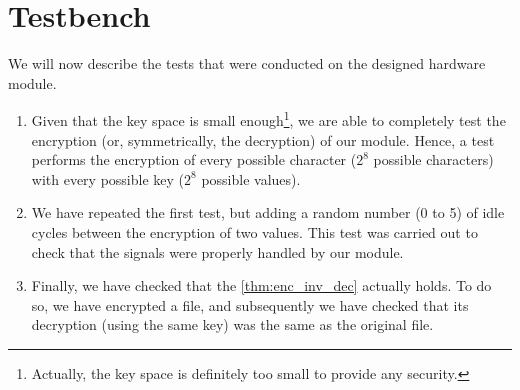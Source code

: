 \section{Testbench}
\label{sec:tests}
We will now describe the tests that were conducted on the designed hardware module.

\begin{enumerate}
    \item Given that the key space is small enough\footnote{Actually, the key space is definitely too small to provide any security.}, we are able to completely test the encryption (or, symmetrically, the decryption) of our module. Hence, a test performs the encryption of every possible character ($2^8$ possible characters) with every possible key ($2^8$ possible values).
    \item We have repeated the first test, but adding a random number (0 to 5) of idle cycles between the encryption of two values. This test was carried out to check that the signals were properly handled by our module.
    \item Finally, we have checked that the \cref{thm:enc_inv_dec} actually holds. To do so, we have encrypted a file, and subsequently we have checked that its decryption (using the same key) was the same as the original file.
\end{enumerate}